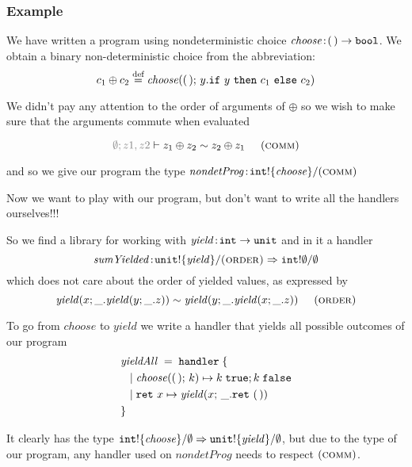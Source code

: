 \documentclass[usenames,dvipsnames]{beamer}
\begin{document}
\begin{frame}
	\frametitle{Example}
	We have written a program using nondeterministic choice
	\(\mathit{choose} \!:\! \mathtt{(\,)} \to \mathtt{bool}	\). We obtain a binary non-deterministic choice from the abbreviation:
	\[
		c_1 \oplus c_2
		\defeq
		\operation[\mathit{choose}]{\unit}{y. \ifclause{y}{c_1}{c_2}}
	\]
	
	We didn't pay any attention to the order of arguments of $\oplus$ so we wish
	to make sure that the arguments commute when evaluated

	\[
		\teqjudgement
			{\textcolor{gray}{\tenvlong{\nil}{z1, z2}}}
			{z_1 \oplus z_2 \rel z_2 \oplus z_1} \hspace{5mm}(\textsc{comm})
	\]

	and so we give our program the type $\mathit{nondetProg} \oftype \ctype{\inttype}{\set{\mathit{choose}}}{(\textsc{comm})}$
\end{frame}
\begin{frame}
	Now we want to play with our program, but don't want to write all the handlers ourselves!!!
	\vspace{5mm}

	So we find a library for working with \(\mathit{yield} \!:\! \mathtt{int} \to \mathtt{unit}	\) and in it a handler 
	\[
		\mathit{sumYielded} \oftype \ctype{\unittype}{\set{\mathit{yield}}}{\textsc{(order)}} \hto \ctype{\inttype}{\nil}{\nil}
	\]
	 which does not care about the order of yielded values, as expressed by
	\[
		\mathit{yield}(x; \_.\mathit{yield}(y; \_.z)) \sim \mathit{yield}(y; \_.\mathit{yield}(x; \_.z)) \hspace{5mm}(\textsc{order})
	\]
\end{frame}
\begin{frame}
	To go from $\mathit{choose}$ to $\mathit{yield}$ we write a handler that yields all possible outcomes of our program
	\begin{align*}
		&\mathit{yieldAll} \; = \; \keyhandler \; \{ \\
		&\tab | \; \operation[\mathit{choose}]{\unit}{k} \mapsto \apply{k}{\true}; \apply{k}{\false} \\
		&\tab | \; \return{x} \mapsto \operation[\mathit{yield}]{x}{\_. \return{\unit}} \\
		&\}
	\end{align*}

	It clearly has the type $\ctype{\inttype}{\set{\mathit{choose}}}{\nil} \hto \ctype{\unittype}{\set{\mathit{yield}}}{\nil}$, but due to the type of our program, any handler used on $\mathit{nondetProg}$ needs to respect $(\textsc{comm})$.
\end{frame}
\end{document}
